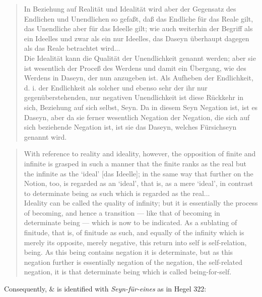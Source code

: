 \documentclass{article}
\begin{document}
\begin{quote}
    In Beziehung auf Realität und Idealität wird aber der Gegensatz des Endlichen und Unendlichen so gefaßt, daß das Endliche für das Reale gilt, das Unendliche aber für das Ideelle gilt; wie auch weiterhin der Begriff als ein Ideelles und zwar als ein nur Ideelles, das Daseyn überhaupt dagegen als das Reale betrachtet wird... \\

    Die Idealität kann die Qualität der Unendlichkeit genannt werden; aber sie ist wesentlich der Proceß des Werdens und damit ein Übergang, wie des Werdens in Daseyn, der nun anzugeben ist. Als Aufheben der Endlichkeit, d. i. der Endlichkeit als solcher und ebenso sehr der ihr nur gegenüberstehenden, nur negativen Unendlichkeit ist diese Rückkehr in sich, Beziehung auf sich selbst, Seyn. Da in diesem Seyn Negation ist, ist es Daseyn, aber da sie ferner wesentlich Negation der Negation, die sich auf sich beziehende Negation ist, ist sie das Daseyn, welches Fürsichseyn genannt wird.
\end{quote}

\begin{quote}
    With reference to reality and ideality, however, the opposition of finite and infinite is grasped in such a manner that the finite ranks as the real but the infinite as the ‘ideal’ [das Ideelle]; in the same way that further on the Notion, too, is regarded as an ‘ideal’, that is, as a mere ‘ideal’, in contrast to determinate being as such which is regarded as the real... \\
    
    Ideality can be called the quality of infinity; but it is essentially the process of becoming, and hence a transition — like that of becoming in determinate being — which is now to be indicated. As a sublating of finitude, that is, of finitude as such, and equally of the infinity which is merely its opposite, merely negative, this return into self is self-relation, being. As this being contains negation it is determinate, but as this negation further is essentially negation of the negation, the self-related negation, it is that determinate being which is called being-for-self.
\end{quote}

Consequently, $\&$ is identified with \emph{Seyn-für-eines} as in Hegel 322:
\end{document}
